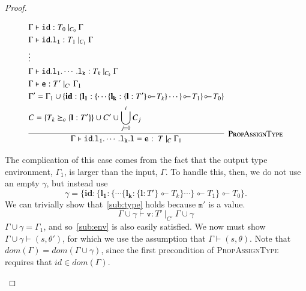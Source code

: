 \documentclass[12pt,a4paper,twoside,openright]{report}
\theoremstyle{definition}
\theoremstyle{dotless}
\newcommand*{\orig}{\ensuremath{\!\multimapinv\!}}
\begin{document}
\begin{proof}
\begin{case}[Assign]
	\begin{subcase}[PropAssignType]

	  $$\infer[\textsc{PropAssignType}]{
  		\Gamma\vdash\mathtt{id.l_1.\cdots.l_k.l = e}:\ T\ |_C\ \Gamma_1
	  }{
  		\begin{split}
		  &\Gamma\vdash\mathtt{id}:T_0\ |_{C_0}\ \Gamma \\
		  &\Gamma\vdash\mathtt{id.l_1}:T_1\ |_{C_1}\ \Gamma \\
		  &\vdots \\
		  &\Gamma\vdash\mathtt{id.l_1.\cdots.l_k}:T_k\ |_{C_k}\ \Gamma \\
		  &\Gamma\vdash\mathtt{e}:T'\ |_{C'}\ \Gamma_1 \\
		  &\Gamma' = \Gamma_1\cup\{\textbf{id}: \{ \mathbf{l_1}: \{\cdots \{\mathbf{l_k}:\{\mathbf{l}: T'\}\orig T_k \} \cdots\} \orig T_1\}\orig T_0\} \\
		  &C = \{T_k \succeq_o \{\mathbf{l}:T'\}\} \cup C' \cup \bigcup_{j=0}^{i}{C_j}
  		\end{split}
	  }$$

		The complication of this case comes from
		the fact that the output type environment, $\Gamma_1$, is larger than the input, $\Gamma$.
		To handle this, then, we do not use an empty $\gamma$, but instead use
		$$\gamma=\{\textbf{id}: \{ \mathbf{l_1}: \{\cdots \{\mathbf{l_k}:\{\mathbf{l}: T'\}\orig T_k \} \cdots\} \orig T_1\}\orig T_0\}.$$
		We can trivially show that~\eqref{sub:type} holds because $\mathtt{m'}$ is a value.
		$$\Gamma\!\cup\!\gamma\vdash\mathtt{v}:T'\ |_{C'}\ \Gamma\!\cup\!\gamma$$
		$\Gamma\!\cup\!\gamma=\Gamma_1$, and so~\eqref{sub:env} is also easily
		satisfied. We now must show $\Gamma\!\cup\!\gamma\vdash(s,
		\theta')$, for which we use the assumption that
		$\Gamma\vdash(s,\theta)$. Note that
		$dom(\Gamma)=dom(\Gamma\!\cup\!\gamma)$, since the first precondition
		of \textsc{PropAssignType} requires that $id\in dom(\Gamma)$.


\end{subcase}
\end{case}
\end{proof}
\end{document}
